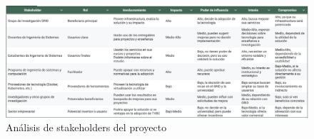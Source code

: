 \begin{figure}[H]
    \centering
    \includegraphics[width=\textwidth] {tablas-images/cp1/definicionStakeholders.png}
    \caption{Análisis de stakeholders del proyecto}\label{fig:tabla-stakeholders}
\end{figure}
